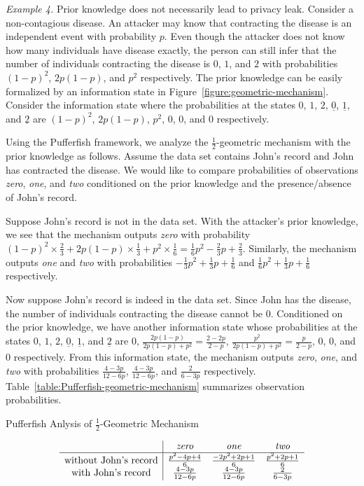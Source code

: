 \noindent
\textit{Example 4.}
Prior knowledge does not necessarily lead to privacy leak. Consider a
non-contagious disease. An attacker may know that contracting the
disease is an independent event with probability $p$. Even though the
attacker does not know how many individuals have disease exactly, the
person can still infer that the number of individuals contracting the
disease is $0$, $1$, and $2$ with probabilities $(1-p)^2$, $2p(1-p)$,
and $p^2$ respectively. The prior knowledge can be easily formalized
by an information state in Figure~\ref{figure:geometric-mechanism}.
Consider the information
state where the probabilities at the states $0$, $1$, $2$,
$\underline{0}$, $\underline{1}$, and $\underline{2}$ are $(1-p)^2$,
$2p(1-p)$, $p^2$, $0$, $0$, and $0$ respectively.

Using the Pufferfish framework, we analyze the $\frac{1}{2}$-geometric
mechanism with the prior knowledge as follows. Assume the data set
contains John's record and John has contracted the disease. We would
like to compare probabilities of observations \textit{zero},
\textit{one}, and \textit{two} conditioned on the prior knowledge and
the presence/absence of John's record.

Suppose John's record is not in the data set. With the attacker's
prior knowledge, we see that the mechanism outputs \textit{zero} with
probability $(1-p)^2 \times \frac{2}{3} + 2p(1-p) \times \frac{1}{3} +
p^2 \times \frac{1}{6} = \frac{1}{6} p^2 - \frac{2}{3} p +
\frac{2}{3}$. Similarly, the mechanism outputs \textit{one} and
\textit{two} with probabilities $-\frac{1}{3} p^2 + \frac{1}{3} p +
\frac{1}{6}$ and $\frac{1}{6} p^2 + \frac{1}{3} p + \frac{1}{6}$
respectively.

Now suppose John's record is indeed in the data set. Since John has
the disease, the number of individuals contracting the disease cannot
be $0$. Conditioned on the prior knowledge, we have another
information state whose probabilities at the states $0$, $1$, $2$,
$\underline{0}$, $\underline{1}$, and $\underline{2}$ are $0$,
$\frac{2p(1-p)}{2p(1-p) + p^2} = \frac{2-2p}{2-p}$,
$\frac{p^2}{2p(1-p) + p^2} = \frac{p}{2-p}$, $0$, $0$, and $0$
respectively. From this information state, the mechanism outputs
\textit{zero}, \textit{one}, and \textit{two} with probabilities
$\frac{4-3p}{12-6p}$, $\frac{4-3p}{12-6p}$, and $\frac{2}{6-3p}$
respectively. Table~\ref{table:Pufferfish-geometric-mechanism}
summarizes observation probabilities.

\begin{table}
  \caption{Pufferfish Anlysis of $\frac{1}{2}$-Geometric Mechanism}
  \label{table:Pufferfish-geometric-mechanism}
  \centering
  \[
    \begin{array}{c|ccc}
      & \textit{zero} & \textit{one} & \textit{two} \\
      \hline
      \textmd{without John's record}
      & \frac{p^2 - 4p + 4}{6}
      & \frac{-2p^2 + 2p + 1}{6}
      & \frac{p^2 + 2p + 1}{6}
      \\

      \textmd{with John's record}
      & \frac{4-3p}{12-6p}
      & \frac{4-3p}{12-6p}
      & \frac{2}{6-3p}
    \end{array}
  \]
\end{table}


